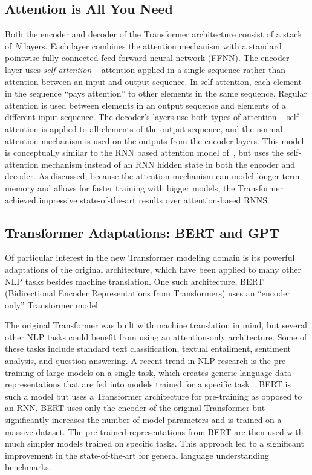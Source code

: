 \subsection{Attention is All You Need}
Both the encoder and decoder of the Transformer architecture consist of a stack of $N$ layers. Each layer combines the attention mechanism with a standard pointwise fully connected feed-forward neural network (FFNN). The encoder layer uses \emph{self-attention} -- attention applied in a single sequence rather than attention between an input and output sequence. In self-attention, each element in the sequence ``pays attention'' to other elements in the same sequence. Regular attention is used between elements in an output sequence and elements of a different input sequence. The decoder's layers use both types of attention -- self-attention is applied to all elements of the output sequence, and the normal attention mechanism is used on the outputs from the encoder layers. This model is conceptually similar to the RNN based attention model of~\citet{bahdanau2014neural}, but uses the self-attention mechanism instead of an RNN hidden state in both the encoder and decoder. As discussed, because the attention mechanism can model longer-term memory and allows for faster training with bigger models, the Transformer achieved impressive state-of-the-art results over attention-based RNNS. 

\subsection{Transformer Adaptations: BERT and GPT}
Of particular interest in the new Transformer modeling domain is its powerful adaptations of the original architecture, which have been applied to many other NLP tasks besides machine translation. One such architecture, BERT (Bidirectional Encoder Representations from Transformers) uses an ``encoder only'' Transformer model~\cite{devlin2018bert}. 

The original Transformer was built with machine translation in mind, but several other NLP tasks could benefit from using an attention-only architecture. Some of these tasks include standard text classification, textual entailment, sentiment analysis, and question answering. A recent trend in NLP research is the pre-training of large models on a single task, which creates generic language data representations that are fed into models trained for a specific task~\cite{peters2018deep}. BERT is such a model but uses a Transformer architecture for pre-training as opposed to an RNN. BERT uses only the encoder of the original Transformer but significantly increases the number of model parameters and is trained on a massive dataset. The pre-trained representations from BERT are then used with much simpler models trained on specific tasks. This approach led to a significant improvement in the state-of-the-art for general language understanding benchmarks.  

